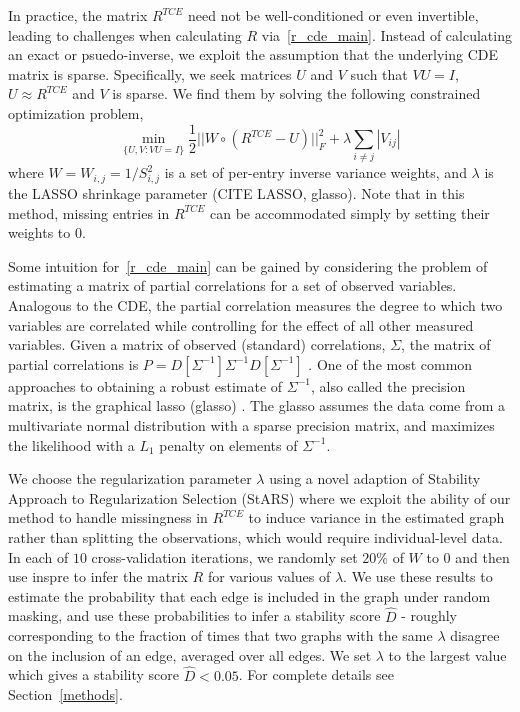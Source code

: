 \documentclass{article}
\begin{document}
In practice, the matrix $R^{TCE}$ need not be well-conditioned or
 even invertible, leading
to challenges when calculating $R$ via~\eqref{r_cde_main}. Instead of calculating an exact
or psuedo-inverse, we exploit the assumption that the underlying
CDE matrix is sparse. Specifically, we seek matrices $U$ and $V$ such that $VU=I$, $U \approx R^{TCE}$ 
and $V$ is sparse. We find them by solving the following constrained optimization problem,
\begin{equation} \label{opt_main}
\min_{\{U, V : VU = I\}} \frac{1}{2} ||W \circ (R^{TCE} - U)||_F^2 +
   \lambda \sum_{i\neq j}|V_{ij}|
\end{equation}
where $W = W_{i,j} = 1/S_{i,j}^2$ is a set of per-entry inverse variance weights,
and $\lambda$ is the LASSO shrinkage parameter (CITE LASSO, glasso). Note that in
this method, missing entries in $R^{TCE}$ can be accommodated simply
by setting their weights to 0. 

Some intuition for~\eqref{r_cde_main} can be gained by considering the problem
of estimating a matrix of partial correlations for a set of observed variables.
Analogous to the CDE, the partial correlation measures the degree to which two
variables are correlated while controlling for the effect of all other measured
variables. Given a matrix of observed (standard) correlations, $\Sigma$, the matrix of
partial correlations is $P = D[\Sigma^{-1}] \Sigma^{-1} D[\Sigma^{-1}]$ . One of
the most common approaches to obtaining a robust estimate of $\Sigma^{-1}$, also called
the precision matrix, is the graphical lasso (glasso) . The glasso assumes the data come from a multivariate normal distribution with a sparse
precision matrix, and maximizes the likelihood with a $L_1$ penalty on elements of $\Sigma^{-1}$.

 We choose the
regularization parameter $\lambda$ using a novel adaption of Stability Approach to Regularization Selection (StARS) where we exploit the
ability of our method to handle missingness in $R^{TCE}$ to induce variance in the estimated graph rather
than splitting the observations, which would require individual-level data.
In each of $10$ cross-validation iterations, we randomly set $20\%$ of $W$ to $0$
and then use inspre to infer the matrix $R$ for various values of $\lambda$.
We use these results to estimate the probability
that each edge is included in the graph under random masking, and use these probabilities
to infer a stability score $\hat{D}$ - roughly corresponding to the fraction of times
that two graphs with the same $\lambda$ disagree on the inclusion of an edge,
 averaged over all edges.
We set $\lambda$ to the largest value which gives a stability score $\hat{D} < 0.05$.
For complete details see Section~\ref{methods}. 
\end{document}
